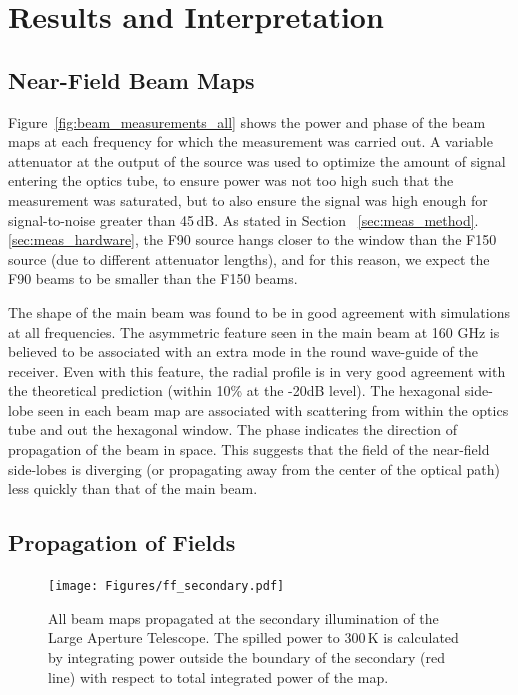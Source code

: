\section{Results and Interpretation}
\label{sec:results}
\subsection{Near-Field Beam Maps}
Figure~\ref{fig:beam_measurements_all} shows the power and phase of the beam maps at each frequency for which the measurement was carried out.   A variable attenuator at the output of the source was used to optimize the amount of signal entering the optics tube, to ensure power was not too high such that the measurement was saturated, but to also ensure the signal was high enough for signal-to-noise greater than 45\,dB.  As stated in Section ~\ref{sec:meas_method}.\ref{sec:meas_hardware}, the F90 source hangs closer to the window than the F150 source (due to different attenuator lengths), and for this reason, we expect the F90 beams to be smaller than the F150 beams.

The shape of the main beam was found to be in good agreement with simulations at all frequencies.  The asymmetric feature seen in the main beam at 160 GHz is believed to be associated with an extra mode in the round wave-guide of the receiver.  Even with this feature, the radial profile is in very good agreement with the theoretical prediction (within 10\% at the -20dB level).   The hexagonal side-lobe seen in each beam map are associated with scattering from within the optics tube and out the hexagonal window.   The phase indicates the direction of propagation of the beam in space.  This suggests that the field of the near-field side-lobes is diverging (or propagating away from the center of the optical path) less quickly than that of the main beam.  

\subsection{Propagation of Fields}
\label{sec:prop_fields}

\begin{figure}[ht]
    \centering
    \texttt{[image: Figures/ff\_secondary.pdf]}
    \caption{All beam maps propagated at the secondary illumination of the Large Aperture Telescope.  The spilled power to 300\,K is calculated by integrating power outside the boundary of the secondary (red line) with respect to total integrated power of the map.}
    \label{fig:secondary}
\end{figure}

